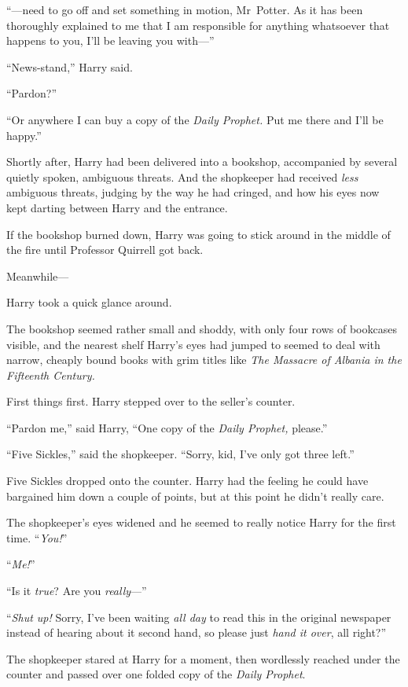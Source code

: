 “—need to go off and set something in motion, Mr~Potter. As it has been thoroughly explained to me that I am responsible for anything whatsoever that happens to you, I’ll be leaving you with—”

“News-stand,” Harry said.

“Pardon?”

“Or anywhere I can buy a copy of the \emph{Daily Prophet.} Put me there and I’ll be happy.”

Shortly after, Harry had been delivered into a bookshop, accompanied by several quietly spoken, ambiguous threats. And the shopkeeper had received \emph{less} ambiguous threats, judging by the way he had cringed, and how his eyes now kept darting between Harry and the entrance.

If the bookshop burned down, Harry was going to stick around in the middle of the fire until Professor Quirrell got back.

Meanwhile—

Harry took a quick glance around.

The bookshop seemed rather small and shoddy, with only four rows of bookcases visible, and the nearest shelf Harry’s eyes had jumped to seemed to deal with narrow, cheaply bound books with grim titles like \emph{The Massacre of Albania in the Fifteenth Century.}

First things first. Harry stepped over to the seller’s counter.

“Pardon me,” said Harry,
“One copy of the \emph{Daily Prophet,} please.”

“Five Sickles,” said the shopkeeper.
“Sorry, kid, I’ve only got three left.”

Five Sickles dropped onto the counter. Harry had the feeling he could have bargained him down a couple of points, but at this point he didn’t really care.

The shopkeeper’s eyes widened and he seemed to really notice Harry for the first time. “\emph{You!}”

“\emph{Me!}”

“Is it \emph{true}? Are you \emph{really}—”

“\emph{Shut up!} Sorry, I’ve been waiting \emph{all day} to read this in the original newspaper instead of hearing about it second hand, so please just \emph{hand it over}, all right?”

The shopkeeper stared at Harry for a moment, then wordlessly reached under the counter and passed over one folded copy of the \emph{Daily Prophet}.

